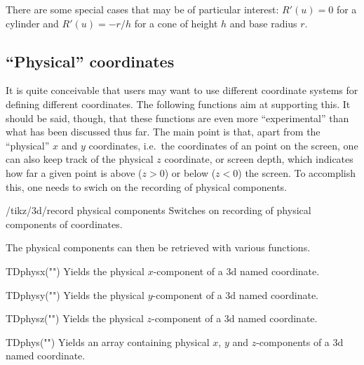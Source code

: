 \documentclass[a4paper,fleqn]{ltxdoc}
\begin{document}
There are some special cases that may be of particular interest: $R'(u)=0$ for a
cylinder and $R'(u)=-r/h$ for a cone of height $h$ and base radius $r$. 

\subsection{``Physical'' coordinates}
\label{sec:PhysicalCoordinates}

It is quite conceivable that users may want to use different coordinate systems
for defining different coordinates. The following functions aim at supporting
this. It should be said, though, that these functions are even more
``experimental'' than what has been discussed thus far. The main point is that,
apart from the ``physical'' $x$ and $y$ coordinates, i.e.\ the coordinates of an
point on the screen, one can also keep track of the physical $z$ coordinate, or
screen depth, which indicates how far a given point is above  ($z>0$) or below
($z<0$) the screen. To accomplish this, one needs to swich on the recording of
physical components.

\begin{key}{/tikz/3d/record physical components}
        Switches on recording of physical components of coordinates.
\end{key}

The physical components can then be retrieved with various functions.

\begin{math-function}{TDphysx("")}
   Yields the physical $x$-component of a 3d named coordinate.
\end{math-function}

\begin{math-function}{TDphysy("")}
   Yields the physical $y$-component of a 3d named coordinate.
\end{math-function}

\begin{math-function}{TDphysz("")}
   Yields the physical $z$-component of a 3d named coordinate.
\end{math-function}

\begin{math-function}{TDphys("")}
   Yields an array containing physical $x$, $y$ and $z$-components of a 3d named
   coordinate.
\end{math-function}
\end{document}
